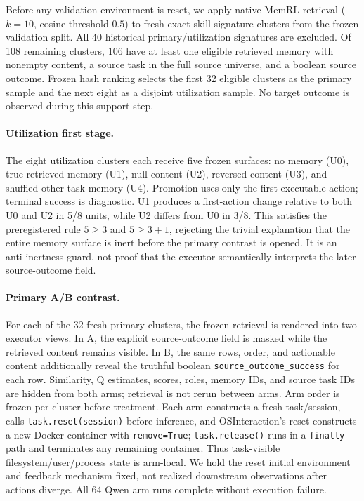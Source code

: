 Before any validation environment is reset, we apply native MemRL retrieval ($k=10$, cosine threshold $0.5$) to fresh exact skill-signature clusters from the frozen validation split. All 40 historical primary/utilization signatures are excluded. Of 108 remaining clusters, 106 have at least one eligible retrieved memory with nonempty content, a source task in the full source universe, and a boolean source outcome. Frozen hash ranking selects the first 32 eligible clusters as the primary sample and the next eight as a disjoint utilization sample. No target outcome is observed during this support step.

\paragraph{Utilization first stage.}
The eight utilization clusters each receive five frozen surfaces: no memory (U0), true retrieved memory (U1), null content (U2), reversed content (U3), and shuffled other-task memory (U4). Promotion uses only the first executable action; terminal success is diagnostic. U1 produces a first-action change relative to both U0 and U2 in 5/8 units, while U2 differs from U0 in 3/8. This satisfies the preregistered rule $5\geq3$ and $5\geq3+1$, rejecting the trivial explanation that the entire memory surface is inert before the primary contrast is opened. It is an anti-inertness guard, not proof that the executor semantically interprets the later source-outcome field.

\paragraph{Primary A/B contrast.}
For each of the 32 fresh primary clusters, the frozen retrieval is rendered into two executor views. In A, the explicit source-outcome field is masked while the retrieved content remains visible. In B, the same rows, order, and actionable content additionally reveal the truthful boolean \texttt{source\_outcome\_success} for each row. Similarity, Q estimates, scores, roles, memory IDs, and source task IDs are hidden from both arms; retrieval is not rerun between arms. Arm order is frozen per cluster before treatment. Each arm constructs a fresh task/session, calls \texttt{task.reset(session)} before inference, and OSInteraction's reset constructs a new Docker container with \texttt{remove=True}; \texttt{task.release()} runs in a \texttt{finally} path and terminates any remaining container. Thus task-visible filesystem/user/process state is arm-local. We hold the reset initial environment and feedback mechanism fixed, not realized downstream observations after actions diverge. All 64 Qwen arm runs complete without execution failure.

